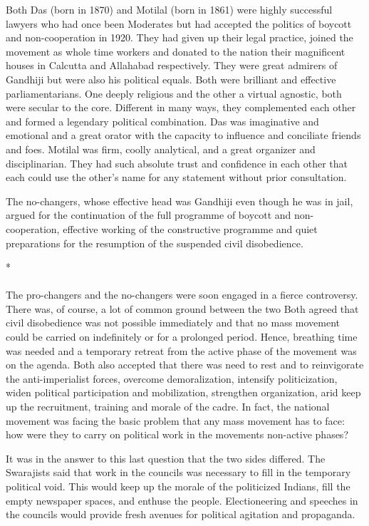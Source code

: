 \begin{multicols}{2}
Both Das (born in 1870) and Motilal (born in 1861) were highly successful lawyers who had once been Moderates but had accepted the politics of boycott and non-cooperation in 1920. They had given up their legal practice, joined the movement as whole time workers and donated to the nation their magnificent houses in Calcutta and Allahabad respectively. They were great admirers of Gandhiji but were also his political equals. Both were brilliant and effective parliamentarians. One deeply religious and the other a virtual agnostic, both were secular to the core. Different in many ways, they complemented each other and formed a legendary political combination. Das was imaginative and emotional and a great orator with the capacity to influence and conciliate friends and foes. Motilal was firm, coolly analytical, and a great organizer and disciplinarian. They had such absolute trust and confidence in each other that each could use the other's name for any statement without prior consultation.

The no-changers, whose effective head was Gandhiji even though he was in jail, argued for the continuation of the full programme of boycott and non-cooperation, effective working of the constructive programme and quiet preparations for the resumption of the suspended civil disobedience.

\begin{center}*\end{center}

\paragraph*{}
The pro-changers and the no-changers were soon engaged in a fierce controversy. There was, of course, a lot of common ground between the two Both agreed that civil disobedience was not possible immediately and that no mass movement could be carried on indefinitely or for a prolonged period. Hence, breathing time was needed and a temporary retreat from the active phase of the movement was on the agenda. Both also accepted that there was need to rest and to reinvigorate the anti-imperialist forces, overcome demoralization, intensify politicization, widen political participation and mobilization, strengthen organization, arid keep up the recruitment, training and morale of the cadre. In fact, the national movement was facing the basic problem that any mass movement has to face: how were they to carry on political work in the movements non-active phases?

It was in the answer to this last question that the two sides differed. The Swarajists said that work in the councils was necessary to fill in the temporary political void. This would keep up the morale of the politicized Indians, fill the empty newspaper spaces, and enthuse the people. Electioneering and speeches in the councils would provide fresh avenues for political agitation and propaganda.


\end{multicols}
